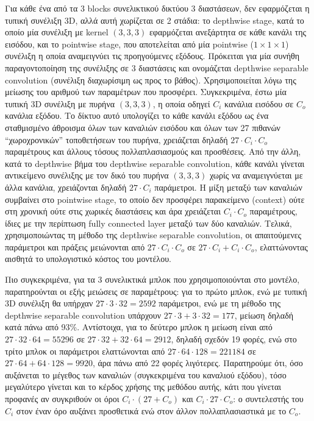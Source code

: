 Για κάθε ένα από τα 3 blocks συνελικτικού δικτύου 3 διαστάσεων, δεν εφαρμόζεται η τυπική συνέλιξη 3D, αλλά αυτή χωρίζεται σε 2 στάδια: το depthwise stage, κατά το οποίο μία συνέλιξη με kernel $(3, 3, 3)$ εφαρμόζεται ανεξάρτητα σε κάθε κανάλι της εισόδου, και το pointwise stage, που αποτελείται από μία pointwise ($1 \times 1 \times 1$) συνέλιξη η οποία αναμειγνύει τις προηγούμενες εξόδους. Πρόκειται για μία συνήθη παραγοντοποίηση της συνέλιξης σε 3 διαστάσεις και ονομάζεται depthwise separable convolution (συνέλιξη διαχωρίσιμη ως προς το βάθος). Χρησιμοποιείται λόγω της μείωσης του αριθμού των παραμέτρων που προσφέρει. Συγκεκριμένα, έστω μία τυπική 3D συνέλιξη με πυρήνα $(3, 3, 3)$, η οποία οδηγεί $C_i$ κανάλια εισόδου σε $C_o$ κανάλια εξόδου. Το δίκτυο αυτό υπολογίζει το κάθε κανάλι εξόδου ως ένα σταθμισμένο άθροισμα όλων των καναλιών εισόδου και όλων των 27 πιθανών ``χωροχρονικών'' τοποθετήσεων του πυρήνα, χρειάζεται δηλαδή $27 \cdot C_i \cdot C_o$  παραμέτρους και άλλους τόσους πολλαπλασιασμούς και προσθέσεις. Από την άλλη, κατά το depthwise βήμα του depthwise separable convolution, κάθε κανάλι γίνεται αντικείμενο συνέλιξης με τον δικό του πυρήνα $(3, 3, 3)$ χωρίς να αναμειγνύεται με άλλα κανάλια, χρειάζονται δηλαδή $27 \cdot C_i$ παράμετροι. Η μίξη μεταξύ των καναλιών συμβαίνει στο pointwise stage, το οποίο δεν προσφέρει παρακείμενο (context) ούτε στη χρονική ούτε στις χωρικές διαστάσεις και άρα χρειάζεται $C_i \cdot C_o$ παραμέτρους, ίδιες με την περίπτωση fully connected layer μεταξύ των δύο καναλιών. Τελικά, χρησιμοποιώντας τη μέθοδο της depthwise separable convolution, οι απαιτούμενες παράμετροι και πράξεις μειώνονται από $27 \cdot C_i \cdot C_o$ σε $27 \cdot C_i + C_i \cdot C_o$, ελαττώνοντας αισθητά το υπολογιστικό κόστος του μοντέλου.

Πιο συγκεκριμένα, για τα 3 συνελικτικά μπλοκ που χρησιμοποιούνται στο μοντέλο, παρατηρούνται οι εξής μειώσεις σε παραμέτρους: για το πρώτο μπλοκ, ενώ με τυπική 3D συνέλιξη θα υπήρχαν $27\cdot3\cdot32 = 2592$ παράμετροι, ενώ με τη μέθοδο της depthwise separable convolution υπάρχουν $27\cdot3+3\cdot32 = 177$, μείωση δηλαδή κατά πάνω από 93\%. Αντίστοιχα, για το δεύτερο μπλοκ η μείωση είναι από $27\cdot32\cdot64 = 55296$ σε $27\cdot32 + 32\cdot64 = 2912$, δηλαδή σχεδόν 19 φορές, ενώ στο τρίτο μπλοκ οι παράμετροι ελαττώνονται από $27\cdot64\cdot128 = 221184$ σε $27\cdot64 + 64\cdot128 = 9920$, άρα πάνω από 22 φορές λιγότερες. Παρατηρούμε ότι, όσο αυξάνεται το μέγεθος των καναλιών (συγκεκριμένα του καναλιού εξόδου), τόσο μεγαλύτερο γίνεται και το κέρδος χρήσης της μεθόδου αυτής, κάτι που γίνεται προφανές αν συγκριθούν οι όροι $C_i\cdot(27+C_o)$ και $C_i\cdot27\cdot C_o$: ο συντελεστής του $C_i$ στον έναν όρο αυξάνει προσθετικά ενώ στον άλλον πολλαπλασιαστικά με το $C_o$.

